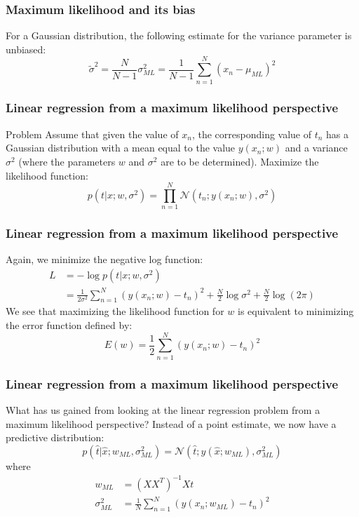 \documentclass{beamer}
\begin{document}
\begin{frame}
    \frametitle{Maximum likelihood and its bias}
    For a Gaussian distribution, the following estimate for the variance parameter is unbiased:
    \begin{equation*}
        \tilde{\sigma}^{2}=\frac{N}{N-1}\sigma^{2}_{ML}=\frac{1}{N-1}\sum_{n=1}^{N}(x_{n}-\mu_{ML})^{2}
    \end{equation*}
\end{frame}

\begin{frame}
    \frametitle{Linear regression from a maximum likelihood perspective}
    \begin{block}{Problem}
        Assume that given the value of $x_{n}$, the corresponding value of $t_{n}$ has a Gaussian distribution with a mean equal to the value $y(x_{n};w)$ and a variance $\sigma^{2}$ (where the parameters $w$ and $\sigma^{2}$ are to be determined). Maximize the
        likelihood function:
        \begin{equation*}
            p(t|x;w,\sigma^{2})=\prod_{n=1}^{N}\mathcal{N}(t_{n};y(x_{n};w),\sigma^{2})
        \end{equation*}
    \end{block}
\end{frame}

\begin{frame}
    \frametitle{Linear regression from a maximum likelihood perspective}
    Again, we minimize the negative log function:
    \begin{align*}
        L&=-\log{}p(t|x;w,\sigma^{2}) \\
        &=\frac{1}{2\sigma^{2}}\sum_{n=1}^{N}(y(x_{n};w)-t_{n})^{2}+\frac{N}{2}\log\sigma^{2}+\frac{N}{2}\log(2\pi)
    \end{align*}
    We see that maximizing the likelihood function for $w$ is equivalent to minimizing the error function defined by:
    \begin{equation*}
        E(w)=\frac{1}{2}\sum_{n=1}^{N}(y(x_{n};w)-t_{n})^{2}
    \end{equation*}
\end{frame}

\begin{frame}
    \frametitle{Linear regression from a maximum likelihood perspective}
    What has us gained from looking at the linear regression problem from a maximum likelihood perspective? Instead of a point estimate, we now have a predictive distribution:
    \begin{equation*}
        p(\hat{t}|\hat{x};w_{ML},\sigma^{2}_{ML})=\mathcal{N}(\hat{t};y(\hat{x};w_{ML}),\sigma^{2}_{ML})
    \end{equation*}
    where
    \begin{align*}
        w_{ML}&=(XX^{T})^{-1}Xt \\
        \sigma^{2}_{ML}&=\frac{1}{N}\sum_{n=1}^{N}(y(x_{n};w_{ML})-t_{n})^{2}
    \end{align*}
\end{frame}
\end{document}

